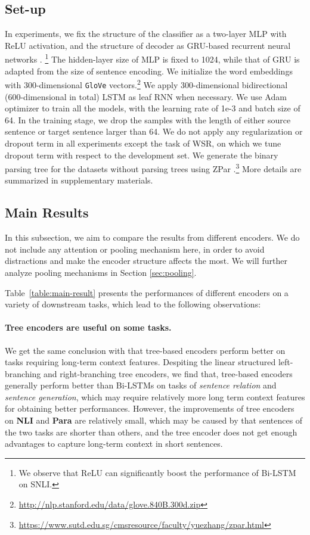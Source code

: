 \documentclass[11pt,a4paper]{article}
\begin{document}
\subsection{Set-up}
\label{sec:set-up}
In experiments, we fix the structure of the classifier as a two-layer MLP with ReLU activation, and the structure of decoder as GRU-based recurrent neural networks \cite{cho2014learning}. \footnote{We observe that ReLU can significantly boost the performance of Bi-LSTM on SNLI.} 
The hidden-layer size of MLP is fixed to 1024, while that of GRU is adapted from the size of sentence encoding. 
We initialize the word embeddings with 300-dimensional {\tt GloVe} \cite{pennington2014glove} vectors.\footnote{\url{http://nlp.stanford.edu/data/glove.840B.300d.zip}}
We apply 300-dimensional bidirectional (600-dimensional in total) LSTM as leaf RNN when necessary.
We use Adam \cite{kingma2014adam} optimizer to train all the models, with the learning rate of 1e-3 and batch size of 64. 
In the training stage, we drop the samples with the length of either source sentence or target sentence larger than 64. 
We do not apply any regularization or dropout term in all experiments except the task of WSR, on which we tune dropout term with respect to the development set. 
We generate the binary parsing tree for the datasets without parsing trees using ZPar \cite{zhang2011syntactic}.\footnote{\url{https://www.sutd.edu.sg/cmsresource/faculty/yuezhang/zpar.html}}
More details are summarized in supplementary materials. 

\subsection{Main Results}
\label{sec:main-results}
In this subsection, we aim to compare the results from different encoders. We do not include any attention \cite{wang2016attention,lin2017astructured} or pooling \cite{collobert2008unified,socher2011dynamic,zhou2016text} mechanism here, in order to avoid distractions and make the encoder structure affects the most. 
We will further analyze pooling mechanisms in Section \ref{sec:pooling}.

Table~\ref{table:main-result} presents the performances of different encoders on a variety of downstream tasks, which lead to the following observations:
\paragraph{Tree encoders are useful on some tasks.} We get the same conclusion with  that tree-based encoders perform better on tasks requiring long-term context features.
Despiting the linear structured left-branching and right-branching tree encoders, we find that, tree-based encoders generally perform better than Bi-LSTMs on tasks of \textit{sentence relation} and \textit{sentence generation}, which may require relatively more long term context features for obtaining better performances.
However, the improvements of tree encoders on \textbf{NLI} and \textbf{Para} are relatively small, which may be caused by that sentences of the two tasks are shorter than others, and the tree encoder does not get enough advantages to capture long-term context in short sentences.
\end{document}
